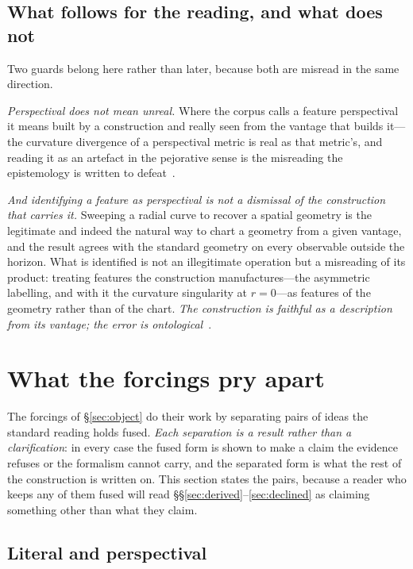 \documentclass[11pt,a4paper]{article}
\theoremstyle{plain}
\theoremstyle{definition}
\begin{document}
\subsection{What follows for the reading, and what does not}

Two guards belong here rather than later, because both are misread in the same direction.

\emph{Perspectival does not mean unreal.} Where the corpus calls a feature perspectival it means built by a
construction and really seen from the vantage that builds it---the curvature divergence of a perspectival
metric is real as that metric's, and reading it as an artefact in the pejorative sense is the misreading the
epistemology is written to defeat~\cite{JanzenShadowExistence,JanzenCircle}.

\emph{And identifying a feature as perspectival is not a dismissal of the construction that carries it.}
Sweeping a radial curve to recover a spatial geometry is the legitimate and indeed the natural way to chart a
geometry from a given vantage, and the result agrees with the standard geometry on every observable outside
the horizon. What is identified is not an illegitimate operation but a misreading of its product: treating
features the construction manufactures---the asymmetric labelling, and with it the curvature singularity at
$r=0$---as features of the geometry rather than of the chart. \emph{The construction is faithful as a
description from its vantage; the error is ontological}~\cite{JanzenCircle}.



\section{What the forcings pry apart}\label{sec:pried}

The forcings of \S\ref{sec:object} do their work by separating pairs of ideas the standard reading holds
fused. \emph{Each separation is a result rather than a clarification}: in every case the fused form is shown
to make a claim the evidence refuses or the formalism cannot carry, and the separated form is what the rest
of the construction is written on. This section states the pairs, because a reader who keeps any of them
fused will read \S\S\ref{sec:derived}--\ref{sec:declined} as claiming something other than what they claim.

\subsection{Literal and perspectival}
\end{document}
